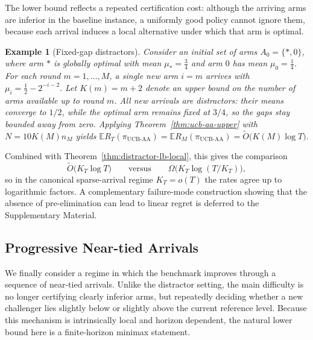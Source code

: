 \documentclass[11pt]{article}
\newtheorem{example}{Example}
\begin{document}
The lower bound reflects a repeated certification cost: although the arriving arms are inferior in
the baseline instance, a uniformly good policy cannot ignore them, because each arrival induces
a local alternative under which that arm is optimal.

\begin{example}[Fixed-gap distractors]
\label{exp:distractors}
Consider an initial set of arms $A_0=\{*,0\}$, where arm $*$ is globally optimal with mean
$\mu_*=\tfrac34$ and arm $0$ has mean $\mu_0=\tfrac14$. For each round $m=1,\dots,M$, a
single new arm $i=m$ arrives with
\(
\mu_i=\frac12-2^{-i-2}.
\)
Let $K(m)=m+2$ denote an upper bound on the number of arms available up to round $m$.
All new arrivals are distractors: their means converge to $1/2$, while the optimal arm remains
fixed at $3/4$, so the gaps stay bounded away from zero. Applying
Theorem~\ref{thm:ucb-aa-upper} with $N=10K(M)n_M$ yields
\(
\mathbb E R_T(\pi_{\mathrm{UCB\text{-}AA}})
=
\mathbb E R_M(\pi_{\mathrm{UCB\text{-}AA}})
=
\widetilde O\bigl(K(M)\log T\bigr).
\)
\end{example}

Combined with Theorem~\ref{thm:distractor-lb-local}, this gives the comparison
\[
\widetilde O\bigl(K_T\log T\bigr)
\qquad\text{versus}\qquad
\Omega\bigl(K_T\log(T/K_T)\bigr),
\]
so in the canonical sparse-arrival regime $K_T=o(T)$ the rates agree up to logarithmic factors.
A complementary failure-mode construction showing that the absence of pre-elimination can lead
to linear regret is deferred to the Supplementary Material.

\subsection{Progressive Near-tied Arrivals}

We finally consider a regime in which the benchmark improves through a sequence of near-tied
arrivals. Unlike the distractor setting, the main difficulty is no longer certifying clearly inferior
arms, but repeatedly deciding whether a new challenger lies slightly below or slightly above the
current reference level. Because this mechanism is intrinsically local and horizon dependent, the
natural lower bound here is a finite-horizon minimax statement.
\end{document}
